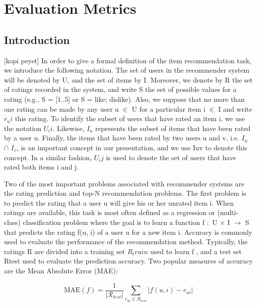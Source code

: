
\chapter{Evaluation Metrics}\label{chapter:evaluation_metrics}

\section{Introduction}
[kopi peyst]
In order to give a formal definition of the item recommendation task, we introduce the following notation. The set of users in the recommender system will be denoted by U, and the set of items by I. Moreover, we denote by R the set of ratings recorded in the system, and write S the set of possible values for a rating (e.g., S = [1..5] or S = {like; dislike}). Also, we suppose that no more than one rating can be made by any user u $\in$  U for a particular item i $\in$ I and write $r_ui$ this rating. To identify the subset of users that have rated an item i, we use the notation $U_ii$. Likewise, $I_u$ represents the subset of items that have been rated by a user u. Finally, the items that have been rated by two users u and v, i.e. $I_u$ $\cap$ $I_v$, is an important concept in our presentation, and we use Iuv to denote this concept. In a similar fashion, $U_ij$ is used to denote the set of users that have rated both items i and j.

Two of the most important problems associated with recommender systems are the rating prediction and top-N recommendation problems. The first problem is to predict the rating that a user u will give his or her unrated item i. When ratings are available, this task is most often defined as a regression or (multi-class) classification problem where the goal is to learn a function f $\colon$ U $\times$ I $\rightarrow$ S that predicts the rating f(u, i) of a user u for a new item i. Accuracy is commonly used to evaluate the performance of the recommendation method. Typically, the ratings R are divided into a training set $R_train$ used to learn f , and a test set Rtest used to evaluate the prediction accuracy. Two popular measures of accuracy are the Mean Absolute Error (MAE):

$$
\mathrm { MAE } ( f ) = \frac { 1 } { \left| \mathcal { R } _ {test} \right| } \sum _ { r _ { u i } \in \mathcal { R } _ {test} } \left| f ( u , i ) - r _ { u i } \right|
$$

